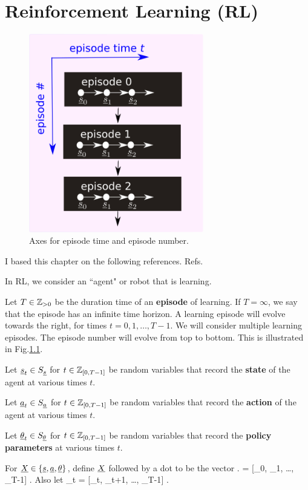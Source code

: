 \chapter{Reinforcement Learning (RL)}
\label{ch-RL}
\begin{figure}[h!]
\centering
\includegraphics[width=3in]{RL/episodes.png}
\caption{Axes 
for episode time and episode number.} 
\label{fig-epi}
\end{figure}

I based this chapter on the following 
references. Refs.\cite{fox}\cite{levine}

In RL, we consider an ``agent" or
robot that
is learning. 

Let $T\in {\mathbb{Z}}_{>0}$ be the duration time
of an {\bf episode} of learning.
If $T=\infty$, we say that the episode
has an infinite time horizon.
A learning episode will 
 evolve
towards the right,
 for times $t=0,1, \ldots, T-1$. 
We will consider multiple learning episodes.
The episode number will
evolve from top to bottom.
This is illustrated in Fig.\ref{fig-epi}.

 Let ${\underline{s}}_t\in S_{\underline{s}} $ 
for $t\in {\mathbb{Z}}_{[0,T-1]}$ be random variables that record the {\bf state} of
the
agent at various times $t$.

Let ${\underline{a}}_t\in S_{\underline{a}}$ for 
$t\in {\mathbb{Z}}_{[0,T-1]}$ be random variables that record the {\bf action} of
the agent at various times $t$.

Let ${\underline{\theta}}_t\in S_{\underline{\theta}}$ 
for $t\in {\mathbb{Z}}_{[0,T-1]}$ be
random variables that record the
 {\bf policy parameters} 
at various times $t$.



For ${\underline{X}}\in \{{\underline{s}}, {\underline{a}}, {\underline{\theta}}\}$, define ${\underline{X}}$ followed by a dot to be the vector 
\beq
\rvX. = 
[\rvX_0, \rvX_1, \ldots, \rvX_{T-1}]
\;.
\eeq
Also let
\beq
\rvX_{\geq t} = 
[\rvX_t, \rvX_{t+1}, \ldots, \rvX_{T-1}]
\;.
\eeq

